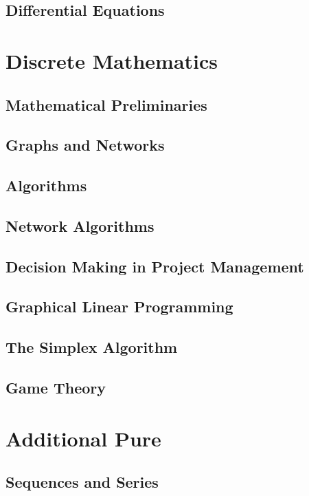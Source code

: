\documentclass[a4paper]{report}
\begin{document}
\chapter{Differential Equations}

\part{Discrete Mathematics}

\chapter{Mathematical Preliminaries}

\chapter{Graphs and Networks}

\chapter{Algorithms}

\chapter{Network Algorithms}

\chapter{Decision Making in Project Management}

\chapter{Graphical Linear Programming}

\chapter{The Simplex Algorithm}

\chapter{Game Theory}

\part{Additional Pure}

\chapter{Sequences and Series}
\end{document}
